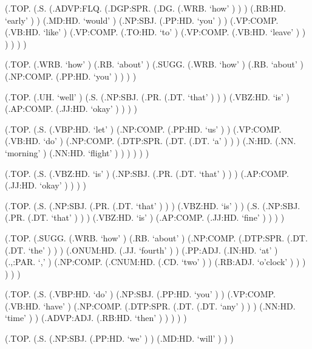 \documentclass[10pt]{article}
\begin{document}
\begin{parsetree}  (.TOP. (.S. (.ADVP:FLQ. (.DGP:SPR. (.DG. (.WRB. `how' ) ) ) (.RB:HD. `early' ) ) (.MD:HD. `would' ) (.NP:SBJ. (.PP:HD. `you' ) ) (.VP:COMP. (.VB:HD. `like' ) (.VP:COMP. (.TO:HD. `to' ) (.VP:COMP. (.VB:HD. `leave' ) ) ) ) ) ) \end{parsetree}

\begin{parsetree}  (.TOP. (.WRB. `how' ) (.RB. `about' ) (.SUGG. (.WRB. `how' ) (.RB. `about' ) (.NP:COMP. (.PP:HD. `you' ) ) ) ) \end{parsetree}

\begin{parsetree}  (.TOP. (.UH. `well' ) (.S. (.NP:SBJ. (.PR. (.DT. `that' ) ) ) (.VBZ:HD. `is' ) (.AP:COMP. (.JJ:HD. `okay' ) ) ) ) \end{parsetree}

\begin{parsetree}  (.TOP. (.S. (.VBP:HD. `let' ) (.NP:COMP. (.PP:HD. `us' ) ) (.VP:COMP. (.VB:HD. `do' ) (.NP:COMP. (.DTP:SPR. (.DT. (.DT. `a' ) ) ) (.N:HD. (.NN. `morning' ) (.NN:HD. `flight' ) ) ) ) ) ) \end{parsetree}

\begin{parsetree}  (.TOP. (.S. (.VBZ:HD. `is' ) (.NP:SBJ. (.PR. (.DT. `that' ) ) ) (.AP:COMP. (.JJ:HD. `okay' ) ) ) ) \end{parsetree}

\begin{parsetree}  (.TOP. (.S. (.NP:SBJ. (.PR. (.DT. `that' ) ) ) (.VBZ:HD. `is' ) ) (.S. (.NP:SBJ. (.PR. (.DT. `that' ) ) ) (.VBZ:HD. `is' ) (.AP:COMP. (.JJ:HD. `fine' ) ) ) ) \end{parsetree}

\begin{parsetree}  (.TOP. (.SUGG. (.WRB. `how' ) (.RB. `about' ) (.NP:COMP. (.DTP:SPR. (.DT. (.DT. `the' ) ) ) (.ONUM:HD. (.JJ. `fourth' ) ) (.PP:ADJ. (.IN:HD. `at' ) (.,:PAR. `,' ) (.NP:COMP. (.CNUM:HD. (.CD. `two' ) ) (.RB:ADJ. `o'clock' ) ) ) ) ) ) \end{parsetree}

\begin{parsetree}  (.TOP. (.S. (.VBP:HD. `do' ) (.NP:SBJ. (.PP:HD. `you' ) ) (.VP:COMP. (.VB:HD. `have' ) (.NP:COMP. (.DTP:SPR. (.DT. (.DT. `any' ) ) ) (.NN:HD. `time' ) ) (.ADVP:ADJ. (.RB:HD. `then' ) ) ) ) ) \end{parsetree}

\begin{parsetree}  (.TOP. (.S. (.NP:SBJ. (.PP:HD. `we' ) ) (.MD:HD. `will' ) ) ) \end{parsetree}
\end{document}

